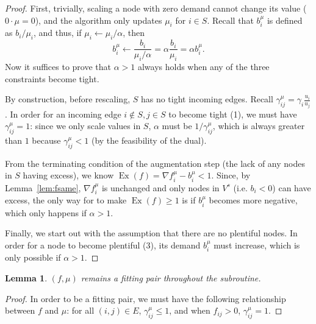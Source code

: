 \documentclass[11pt]{article}
\let\comment\todo
\newcommand{\frank}[1]{\comment[nolist,color=blue!40]{f: #1}}
\newtheorem{lemma}[theorem]{Lemma}
\theoremstyle{definition}
\theoremstyle{definition}
\theoremstyle{definition}
\newcommand{\fu}{f^{\mu}}
\newcommand{\nfiu}{\nabla \fu_i}
\newcommand{\biu}{b_{i}^{\mu}}
\newcommand{\giij}{\gamma_{ij}^{\mu}}
\newcommand{\vsrc}{V^{s}}
\newcommand{\fp}{(f,\mu)}
\DeclareMathOperator{\Ex}{Ex}
\renewcommand{\todo}[1]{\hl{TODO: #1}}
\begin{document}
    \begin{proof}
        First, trivially, scaling a node with zero demand cannot change its value
        ($0\cdot\mu=0$), and the algorithm only updates $\mu_i$ for $i \in S$. Recall
        that $\biu$ is defined as $b_i / \mu_i$, and thus, if $\mu_i\leftarrow \mu_i / \alpha$,
        then
        \[ \biu \leftarrow \frac{b_i}{\mu_i / \alpha} = \alpha\frac{b_i}{\mu_i} = \alpha \biu. \] 
        Now it suffices to prove that $\alpha > 1$ always holds when any of the three
        constraints become tight.

        By construction, before rescaling, $S$ has no tight
        incoming edges. Recall $\giij = \gamma_i\frac{u_i}{u_j}$. In order for an
        incoming edge $i \notin S, j\in S$ to become tight (1), we must have $\giij=1$:
        since we only scale values in $S$, $\alpha$ must be ${1}/{\giij}$, which is
        always greater than $1$ because $\giij < 1$ (by the feasibility of the dual).

        From the terminating condition of the augmentation step (the lack of any nodes
        in $S$ having excess), we know $\Ex(f) = \nfiu - \biu < 1$. Since, by
        Lemma~\ref{lem:fsame}, $\nfiu$ is unchanged and only nodes in $\vsrc$ (i.e. $b_i<0$)
        can have excess, the only way for to make $\Ex(f) \ge 1$ is if $\biu$ becomes
        more negative, which only happens if $\alpha > 1$. 

        Finally, we start out with the assumption that there are no plentiful nodes.
        In order for a node to become plentiful (3), its demand $\biu$ must increase,
        which is only possible if $\alpha > 1$.
    \end{proof}
    \begin{lemma}
        \label{lem:still-fit}
        $\fp$ remains a fitting pair throughout the subroutine.
    \end{lemma}
    \begin{proof}
        In order to be a fitting pair, we must have the following relationship between
        $f$ and $\mu$: for all $(i, j) \in E$, $\giij \leq 1$, and when $f_{ij} > 0$, 
				$\giij = 1$. \frank{finish this}
    \end{proof}
\end{document}
